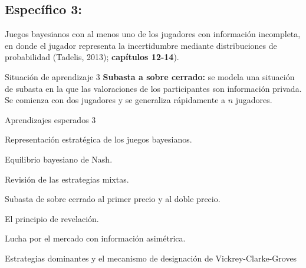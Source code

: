 \documentclass[11pt]{article}
\newenvironment{tight_enumerate}{
	\begin{enumerate}
		\setlength{\itemsep}{0pt}
		\setlength{\parskip}{0pt}
	}{\end{enumerate}}
\begin{document}
\begin{tcolorbox}[colback=bluerow!60]
	\subsection{Específico 3: }
	Juegos bayesianos con al menos uno de los jugadores con información incompleta, en donde el jugador representa la incertidumbre mediante distribuciones de probabilidad (Tadelis, 2013); \textbf{capítulos 12-14}).
	\begin{mybox}[colback=redrow!80]{Situación de aprendizaje 3}
		\textbf{Subasta a sobre cerrado:} se modela una situación de subasta en la que las valoraciones de los participantes son información privada. Se comienza con dos jugadores y se generaliza rápidamente a $n$ jugadores.
	\end{mybox}
	
	\begin{mybox}[colback=purplerow!80]{Aprendizajes esperados 3}
		\begin{tight_enumerate}
			\item Representación estratégica de los juegos bayesianos. 
			\item Equilibrio bayesiano de Nash. 
			\item Revisión de las estrategias mixtas. 
			\item Subasta de sobre cerrado al primer precio y al doble precio. 
			\item El principio de revelación. 
			\item Lucha por el mercado con información asimétrica. 
			\item Estrategias dominantes y el mecanismo de designación de Vickrey-Clarke-Groves
		\end{tight_enumerate}
	\end{mybox}
\end{tcolorbox}

\vspace{1em}
\end{document}
